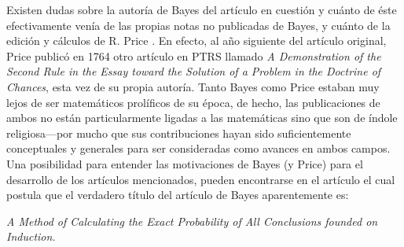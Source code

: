 Existen dudas sobre la autoría de Bayes del artículo en cuestión y cuánto de éste efectivamente venía de las propias notas no publicadas de Bayes, y cuánto de la edición y cálculos de R. Price \cite{bellhouse_2004}. En efecto, al año siguiente del artículo original, Price publicó en 1764 otro artículo en PTRS llamado \emph{A Demonstration of the Second Rule in the Essay toward the Solution of a Problem in the Doctrine of Chances}, esta vez de su propia autoría. Tanto Bayes como Price estaban muy lejos de ser  matemáticos prolíficos de su época, de hecho, las publicaciones de ambos no están particularmente ligadas a las matemáticas sino que son de índole religiosa---por mucho que sus contribuciones hayan sido suficientemente  conceptuales y generales para ser consideradas como avances en ambos campos. Una posibilidad para entender las motivaciones de Bayes (y Price) para el desarrollo de los artículos mencionados, pueden encontrarse en el artículo \cite{stigler2013} el cual postula que el verdadero título del artículo de Bayes aparentemente es: 
\begin{center}
\it
A Method of Calculating the Exact Probability of All Conclusions founded on Induction.
\end{center}
